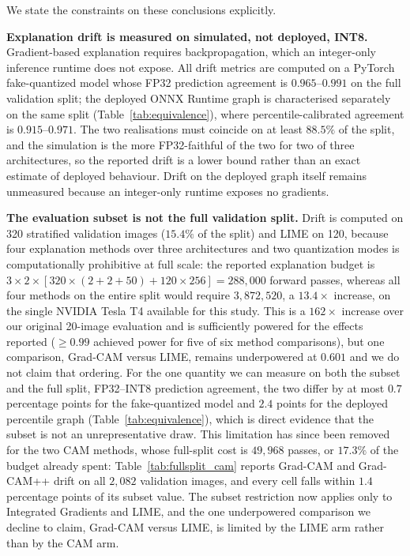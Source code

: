 \documentclass[fleqn,10pt]{wlscirep}
\begin{document}
We state the constraints on these conclusions explicitly.

\textbf{Explanation drift is measured on simulated, not deployed, INT8.} Gradient-based explanation requires backpropagation, which an integer-only inference runtime does not expose. All drift metrics are computed on a PyTorch fake-quantized model whose FP32 prediction agreement is $0.965$--$0.991$ on the full validation split; the deployed ONNX Runtime graph is characterised separately on the same split (Table~\ref{tab:equivalence}), where percentile-calibrated agreement is $0.915$--$0.971$. The two realisations must coincide on at least $88.5\%$ of the split, and the simulation is the more FP32-faithful of the two for two of three architectures, so the reported drift is a lower bound rather than an exact estimate of deployed behaviour. Drift on the deployed graph itself remains unmeasured because an integer-only runtime exposes no gradients.

\textbf{The evaluation subset is not the full validation split.} Drift is computed on 320 stratified validation images ($15.4\%$ of the split) and LIME on 120, because four explanation methods over three architectures and two quantization modes is computationally prohibitive at full scale: the reported explanation budget is $3 \times 2 \times [320 \times (2 + 2 + 50) + 120 \times 256] = 288{,}000$ forward passes, whereas all four methods on the entire split would require $3{,}872{,}520$, a $13.4\times$ increase, on the single NVIDIA Tesla T4 available for this study. This is a $162\times$ increase over our original 20-image evaluation and is sufficiently powered for the effects reported ($\geq 0.99$ achieved power for five of six method comparisons), but one comparison, Grad-CAM versus LIME, remains underpowered at $0.601$ and we do not claim that ordering. For the one quantity we can measure on both the subset and the full split, FP32--INT8 prediction agreement, the two differ by at most $0.7$ percentage points for the fake-quantized model and $2.4$ points for the deployed percentile graph (Table~\ref{tab:equivalence}), which is direct evidence that the subset is not an unrepresentative draw. This limitation has since been removed for the two CAM methods, whose full-split cost is $49{,}968$ passes, or $17.3\%$ of the budget already spent: Table~\ref{tab:fullsplit_cam} reports Grad-CAM and Grad-CAM++ drift on all $2{,}082$ validation images, and every cell falls within $1.4$ percentage points of its subset value. The subset restriction now applies only to Integrated Gradients and LIME, and the one underpowered comparison we decline to claim, Grad-CAM versus LIME, is limited by the LIME arm rather than by the CAM arm.
\end{document}
